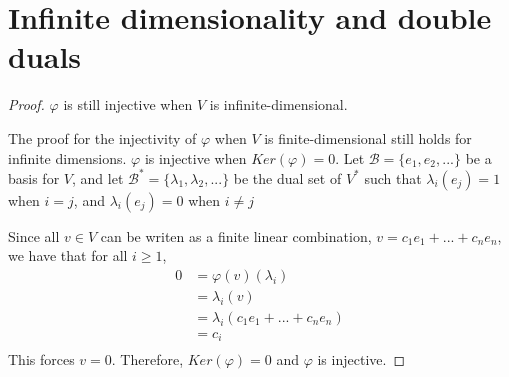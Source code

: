\section{Infinite dimensionality and double duals}

\begin{proof} $\varphi$ is still injective when $V$ is infinite-dimensional. \gap

    The proof for the injectivity of $\varphi$ when $V$ is finite-dimensional 
    still holds for infinite dimensions.
    $\varphi$ is injective when $Ker(\varphi) = 0$.
    Let $\mathcal{B} = \{e_1, e_2,...\}$ be a basis for $V$, and
    let $\mathcal{B}^* = \{\lambda_1, \lambda_2,...\}$ 
    be the dual set of $V^*$ such that
    $\lambda_i(e_j) = 1$ when $i=j$, and 
    $\lambda_i(e_j) = 0$ when $i \neq j$\gap

    Since all $v \in V$ can be writen as a finite linear combination,
    $v = c_1e_1 +...+ c_ne_n$,
    we have that for all $i \geq 1$,
    \begin{align}
        0
        &= \varphi(v)(\lambda_i)\\
        &= \lambda_i(v)\\
        &= \lambda_i(c_1e_1 +...+ c_ne_n)\\
        &= c_i\\ 
    \end{align}
    This forces $v=0$.
    Therefore, $Ker(\varphi) = 0$ and $\varphi$ is injective.
\end{proof}

